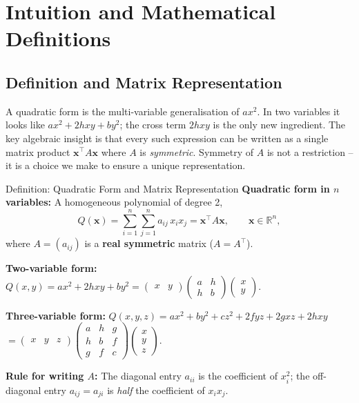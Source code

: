 \documentclass[12pt,a4paper]{article}
\begin{document}
\section{Intuition and Mathematical Definitions}

\subsection{Definition and Matrix Representation}

A quadratic form is the multi-variable generalisation of $ax^{2}$. In two variables it looks like $ax^{2} + 2hxy + by^{2}$; the cross term $2hxy$ is the only new ingredient. The key algebraic insight is that every such expression can be written as a single matrix product $\mathbf{x}^{\top}A\mathbf{x}$ where $A$ is \emph{symmetric}. Symmetry of $A$ is not a restriction -- it is a choice we make to ensure a unique representation.

\begin{infobox}{Definition: Quadratic Form and Matrix Representation}
\textbf{Quadratic form in $n$ variables:} A homogeneous polynomial of degree 2,
\[
  Q(\mathbf{x}) = \sum_{i=1}^{n}\sum_{j=1}^{n} a_{ij}\, x_i x_j
  = \mathbf{x}^{\top} A \mathbf{x}, \qquad \mathbf{x} \in \mathbb{R}^{n},
\]
where $A = (a_{ij})$ is a \textbf{real symmetric} matrix ($A = A^{\top}$).

\textbf{Two-variable form:}
$Q(x,y) = ax^{2} + 2hxy + by^{2}
= \begin{pmatrix} x & y \end{pmatrix}
  \begin{pmatrix} a & h \\ h & b \end{pmatrix}
  \begin{pmatrix} x \\ y \end{pmatrix}.$

\textbf{Three-variable form:}
$Q(x,y,z) = ax^{2}+by^{2}+cz^{2}+2fyz+2gxz+2hxy$
$= \begin{pmatrix} x & y & z \end{pmatrix}
   \begin{pmatrix} a & h & g \\ h & b & f \\ g & f & c \end{pmatrix}
   \begin{pmatrix} x \\ y \\ z \end{pmatrix}.$

\textbf{Rule for writing $A$:} The diagonal entry $a_{ii}$ is the coefficient of $x_i^{2}$; the off-diagonal entry $a_{ij} = a_{ji}$ is \emph{half} the coefficient of $x_i x_j$.
\end{infobox}
\end{document}
